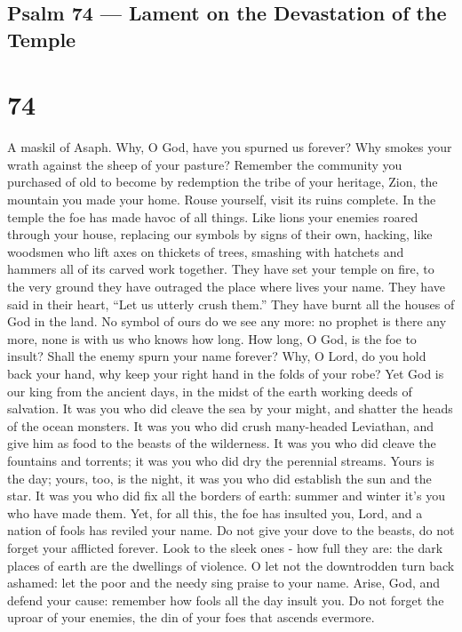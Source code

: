 \hypertarget{psalm-74-lament-on-the-devastation-of-the-temple}{%
\subsection{Psalm 74 --- Lament on the Devastation of the
Temple}\label{psalm-74-lament-on-the-devastation-of-the-temple}}

\hypertarget{section-73}{%
\section{74}\label{section-73}}

A maskil of Asaph.  Why, O God, have you spurned us forever?
Why smokes your wrath against the sheep of your pasture? 
Remember the community you purchased of old to become by redemption the
tribe of your heritage, Zion, the mountain you made your home.
 Rouse yourself, visit its ruins complete. In the temple the
foe has made havoc of all things.  Like lions your enemies
roared through your house, replacing our symbols by signs of their own,
 hacking, like woodsmen who lift axes on thickets of trees,
 smashing with hatchets and hammers all of its carved work
together.  They have set your temple on fire, to the very
ground they have outraged the place where lives your name. 
They have said in their heart, ``Let us utterly crush them.'' They have
burnt all the houses of God in the land.  No symbol of ours
do we see any more: no prophet is there any more, none is with us who
knows how long.  How long, O God, is the foe to insult?
Shall the enemy spurn your name forever?  Why, O Lord, do
you hold back your hand, why keep your right hand in the folds of your
robe?  Yet God is our king from the ancient days, in the
midst of the earth working deeds of salvation.  It was you
who did cleave the sea by your might, and shatter the heads of the ocean
monsters.  It was you who did crush many-headed Leviathan,
and give him as food to the beasts of the wilderness.  It
was you who did cleave the fountains and torrents; it was you who did
dry the perennial streams.  Yours is the day; yours, too,
is the night, it was you who did establish the sun and the star.
 It was you who did fix all the borders of earth: summer
and winter it's you who have made them.  Yet, for all this,
the foe has insulted you, Lord, and a nation of fools has reviled your
name.  Do not give your dove to the beasts, do not forget
your afflicted forever.  Look to the sleek ones - how full
they are: the dark places of earth are the dwellings of violence.
 O let not the downtrodden turn back ashamed: let the poor
and the needy sing praise to your name.  Arise, God, and
defend your cause: remember how fools all the day insult you.
 Do not forget the uproar of your enemies, the din of your
foes that ascends evermore.

